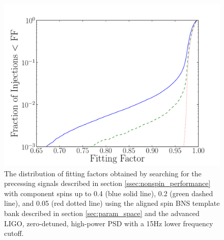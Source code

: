 \begin{figure}
\begin{center}
\includegraphics[width=1.0\textwidth]{papers/bns_spin/figure10.pdf}
\end{center}
\caption{\label{fig:anstar-prec} The distribution of fitting factors obtained by searching
for the precessing signals described in section \ref{ssec:nonspin_performance}
with component spins up to 0.4 (blue solid line), 0.2 (green dashed line), and 0.05 (red dotted line) using the aligned spin
BNS template bank described in section \ref{sec:param_space} and the advanced LIGO, zero-detuned,
high-power PSD with a 15Hz lower frequency cutoff.}
\end{figure}
